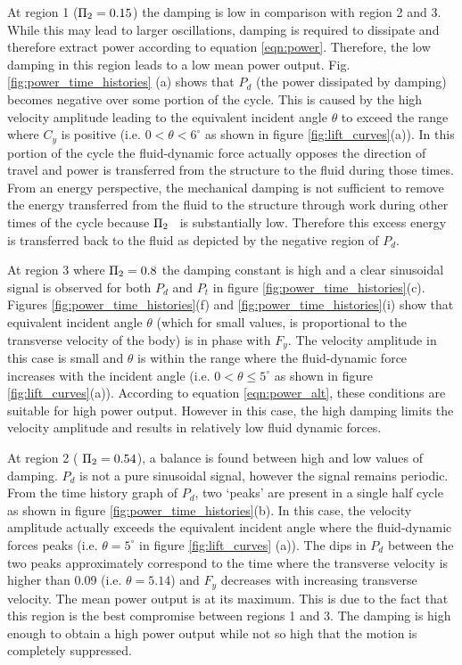 At region 1 ($\Pi_2=0.15$) the damping is low in comparison with region 2 and 3. While this may lead to larger oscillations, damping is required to dissipate and therefore extract power according to equation \ref{eqn:power}. Therefore, the low damping in this region leads to a low mean power output. Fig.\ref{fig:power_time_histories} (a) shows that $P_d$ (the power dissipated by damping) becomes negative over some portion of the cycle. This is caused by the high velocity amplitude leading to the equivalent incident angle $\theta$ to exceed the range where $C_y$ is positive (i.e. $0<\theta<6^\circ$ as shown in figure \ref{fig:lift_curves}(a)). In this portion of the cycle the fluid-dynamic force actually opposes the direction of travel and power is transferred from the structure to the fluid during those times. From an energy perspective, the mechanical damping is not sufficient to remove the energy transferred from the fluid to the structure through work during other times of the cycle because $\Pi_2$ \ is substantially low. Therefore this excess energy is transferred back to the fluid as depicted by the negative region of $P_d$.

\vspace{1mm} 
At region 3 where $\Pi_2=0.8$ the damping constant is high and a clear sinusoidal signal is observed for both $P_d$ and $P_t$ in figure \ref{fig:power_time_histories}(c). Figures \ref{fig:power_time_histories}(f) and  \ref{fig:power_time_histories}(i) show that equivalent incident angle $\theta$ (which for small values, is proportional to the transverse velocity of the body) is in phase with $F_y$.  The velocity amplitude in this case is small and $\theta$ is within the range where the fluid-dynamic force increases with the incident angle (i.e. $0<\theta \leq 5^\circ$ as shown in figure \ref{fig:lift_curves}(a)). According to equation \ref{eqn:power_alt}, these conditions are suitable for high power output. However in this case, the high damping limits the velocity amplitude and results in relatively low fluid dynamic forces.

At region 2 ( $\Pi_2=0.54$), a balance is found between high and low values of damping. $P_d$ is not a pure sinusoidal signal, however the signal remains periodic. From the time history graph of $P_d$, two `peaks' are present in a single half cycle as shown in figure \ref{fig:power_time_histories}(b). In this case, the velocity amplitude actually exceeds the equivalent incident angle where the fluid-dynamic forces peaks (i.e. $\theta=5^\circ$ in figure \ref{fig:lift_curves} (a)). The dips in $P_d$ between the two peaks approximately correspond to the time where the transverse velocity is higher than 0.09 (i.e. $\theta=5.14$) and $F_y$ decreases with increasing transverse velocity. The mean power output is at its maximum. This is due to the fact that this region is the best compromise between regions 1 and 3. The damping is high enough to obtain a high power output while not so high that the motion is completely suppressed.


